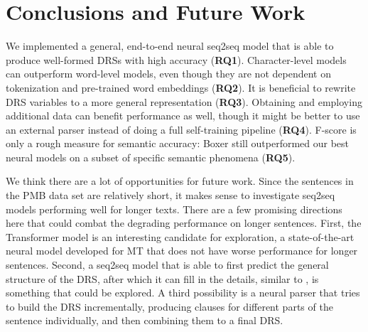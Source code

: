 \documentclass[11pt,a4paper]{article}
\begin{document}
\begin{table}[t]
\centering
{}
\caption{Manual evaluation of the output of the three semantic parsers on several semantic phenomena. Reported numbers are accuracies.}
\label{tab:manual_eval}
\end{table}

\section{Conclusions and Future Work}
\label{sec:conclusion}

We implemented a general, end-to-end neural seq2seq model that is able to produce well-formed DRSs with high accuracy (\textbf{RQ1}). Character-level models can outperform word-level models, even though they are not dependent on tokenization and pre-trained word embeddings (\textbf{RQ2}). It is beneficial to rewrite DRS variables to a more general representation (\textbf{RQ3}). Obtaining and employing additional data can benefit performance as well, though it might be better to use an external parser instead of doing a full self-training pipeline (\textbf{RQ4}). 
F-score is only a rough measure for semantic accuracy: Boxer still outperformed our best neural models on a subset of specific semantic phenomena (\textbf{RQ5}). 

We think there are a lot of opportunities for future work. Since the sentences in the PMB data set are relatively short, it makes sense to investigate seq2seq models performing well for longer texts. There are a few promising directions here that could combat the degrading performance on longer sentences. First, the Transformer model \cite{transformer:17} is an interesting candidate for exploration, a state-of-the-art neural model developed for MT that does not have worse performance for longer sentences. Second, a seq2seq model that is able to first predict the general structure of the DRS, after which it can fill in the details, similar to , is something that could be explored. A third possibility is a neural parser that tries to build the DRS incrementally, producing clauses for different parts of the sentence individually, and then combining them to a final DRS.
\end{document}
